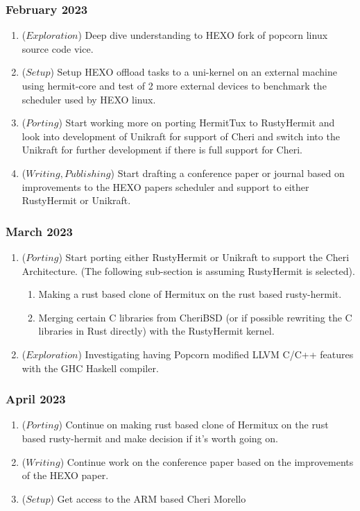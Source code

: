   \subsubsection{February 2023}
  \begin{enumerate}
    \item (\(Exploration\)) Deep dive understanding to HEXO fork of popcorn linux source code vice.
    \item (\(Setup\)) Setup HEXO offload tasks to a uni-kernel on an external machine using hermit-core 
    and test of 2 more external devices to benchmark the scheduler used by HEXO linux. 
    \item (\(Porting\)) Start working more on porting HermitTux to RustyHermit and look into 
    development of Unikraft for support of Cheri and switch into the Unikraft for further 
    development if there is full support for Cheri. 
    \item (\(Writing, Publishing\)) Start drafting a conference paper or journal based on improvements to the HEXO papers 
    scheduler and support to either RustyHermit or Unikraft. 
  \end{enumerate}

  \subsubsection{March 2023}
  \begin{enumerate}
    \item (\(Porting\)) Start porting either RustyHermit or Unikraft to support the Cheri Architecture. (The following sub-section is assuming 
          RustyHermit is selected).
          \begin{enumerate}
            \item Making a rust based clone of Hermitux on the rust based rusty-hermit. 
            \item Merging certain C libraries from CheriBSD (or if possible rewriting the C libraries in Rust directly) 
            with the RustyHermit kernel. 
          \end{enumerate}
    \item (\(Exploration\)) Investigating having Popcorn modified LLVM C/C++ features with the GHC Haskell compiler. 
  \end{enumerate}

  \subsubsection{April 2023}
  \begin{enumerate}
    \item (\(Porting\)) Continue on making rust based clone of Hermitux on the rust based rusty-hermit and make decision if it's worth going on.
    \item (\(Writing\)) Continue work on the conference paper based on the improvements of the HEXO paper.
    \item (\(Setup\)) Get access to the ARM based Cheri Morello
  \end{enumerate}

